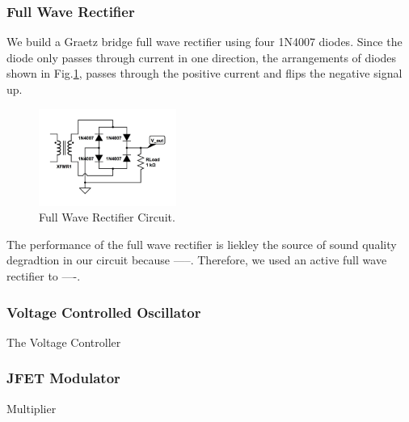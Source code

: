 \documentclass[authoryear, 12pt,5p, times]{elsarticle}
\begin{document}
\subsubsection{Full Wave Rectifier}
We build a Graetz bridge full wave rectifier using four 1N4007 diodes. Since the diode only passes through current in one direction, the arrangements of diodes shown in Fig.\ref{rectifier}, passes through the positive current and flips the negative signal up.
\begin{figure}[h!]
 \centering
 \includegraphics[width=0.4\textwidth]{figure/full_wave_rectifier.jpg}
\caption{Full Wave Rectifier Circuit.}
\label{rectifier}
\end{figure}
\par The performance of the full wave rectifier is liekley the source of sound quality degradtion in our circuit because -----. Therefore, we used an active full wave rectifier to ----.
\subsubsection{Voltage Controlled Oscillator}
The Voltage Controller 
\subsubsection{JFET Modulator}
Multiplier
\end{document}
